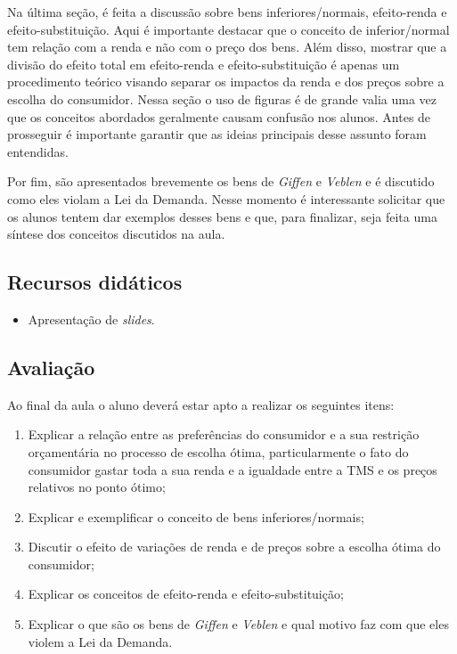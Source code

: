 \documentclass[
	article,			%
	12pt,				%
	twoside,			%
	a4paper,			%
	section=TITLE,		%
	english,			%
	brazil,				%
	sumario=tradicional
]{abntex2-modelo-plano-de-aula}
\begin{document}
Na última seção, é feita a discussão sobre bens inferiores/normais, efeito-renda e efeito-substituição. Aqui é importante destacar que o conceito de inferior/normal tem relação com a renda e não com o preço dos bens. Além disso, mostrar que a divisão do efeito total em efeito-renda e efeito-substituição é apenas um procedimento teórico visando separar os impactos da renda e dos preços sobre a escolha do consumidor. Nessa seção o uso de figuras é de grande valia uma vez que os conceitos abordados geralmente causam confusão nos alunos. Antes de prosseguir é importante garantir que as ideias principais desse assunto foram entendidas.

Por fim, são apresentados brevemente os bens de \textit{Giffen} e \textit{Veblen} e é discutido como eles violam a Lei da Demanda. Nesse momento é interessante solicitar que os alunos tentem dar exemplos desses bens e que, para finalizar, seja feita uma síntese dos conceitos discutidos na aula.

\begin{snugshade}
	\section{\textbf{Recursos didáticos}} %
\end{snugshade}

\begin{itemize}
	
	\item Apresentação de \textit{slides}.
	
\end{itemize}

\begin{snugshade}
	\section{\textbf{Avaliação}} %
\end{snugshade}

Ao final da aula o aluno deverá estar apto a realizar os seguintes itens:

\begin{enumerate}	
	\item Explicar a relação entre as preferências do consumidor e a sua restrição orçamentária no processo de escolha ótima, particularmente o fato do consumidor gastar toda a sua renda e a igualdade entre a TMS e os preços relativos no ponto ótimo;
	\item Explicar e exemplificar o conceito de bens inferiores/normais;
	\item Discutir o efeito de variações de renda e de preços sobre a escolha ótima do consumidor;
	\item Explicar os conceitos de efeito-renda e efeito-substituição;
	\item Explicar o que são os bens de \textit{Giffen} e \textit{Veblen} e qual motivo faz com que eles violem a Lei da Demanda.
\end{enumerate}
\end{document}
